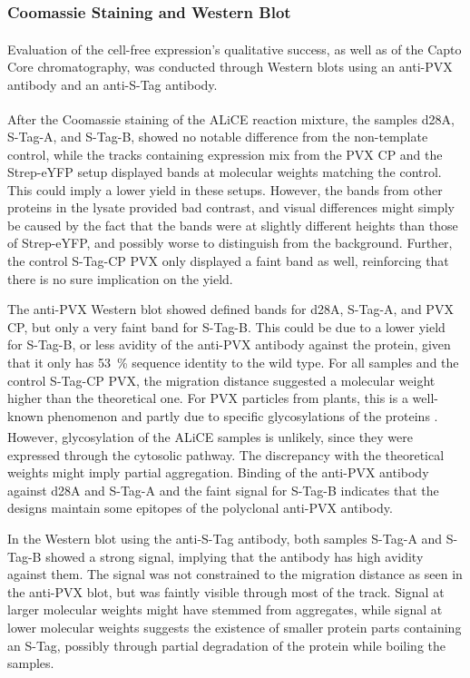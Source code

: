 \subsubsection{Coomassie Staining and Western Blot}
Evaluation of the cell-free expression's qualitative success, as well as of the Capto\textsuperscript{\texttrademark} Core chromatography, was conducted through Western blots using an anti-PVX antibody and an anti-S-Tag antibody.

After the Coomassie staining of the ALiCE\textsuperscript{\textregistered} reaction mixture, the samples d28A, S-Tag-A, and S-Tag-B, showed no notable difference from the non-template control, while the tracks containing expression mix from the PVX CP and the Strep-eYFP setup displayed bands at molecular weights matching the control. This could imply a lower yield in these setups. However, the bands from other proteins in the lysate provided bad contrast, and visual differences might simply be caused by the fact that the bands were at slightly different heights than those of Strep-eYFP, and possibly worse to distinguish from the background. Further, the control S-Tag-CP PVX only displayed a faint band as well, reinforcing that there is no sure implication on the yield. 

The anti-PVX Western blot showed defined bands for d28A, S-Tag-A, and PVX CP, but only a very faint band for S-Tag-B. This could be due to a lower yield for S-Tag-B, or less avidity of the anti-PVX antibody against the protein, given that it only has \SI{53}{\percent} sequence identity to the wild type. For all samples and the control S-Tag-CP PVX, the migration distance suggested a molecular weight higher than the theoretical one. For PVX particles from plants, this is a well-known phenomenon and partly due to specific glycosylations of the proteins \cite{pvx_glycosylation}. However, glycosylation of the ALiCE\textsuperscript{\textregistered} samples is unlikely, since they were expressed through the cytosolic pathway. The discrepancy with the theoretical weights might imply partial aggregation. Binding of the anti-PVX antibody against d28A and S-Tag-A and the faint signal for S-Tag-B indicates that the designs maintain some epitopes of the polyclonal anti-PVX antibody. 

In the Western blot using the anti-S-Tag antibody, both samples S-Tag-A and S-Tag-B showed a strong signal, implying that the antibody has high avidity against them. The signal was not constrained to the migration distance as seen in the anti-PVX blot, but was faintly visible through most of the track. Signal at larger molecular weights might have stemmed from aggregates, while signal at lower molecular weights suggests the existence of smaller protein parts containing an S-Tag, possibly through partial degradation of the protein while boiling the samples. 


